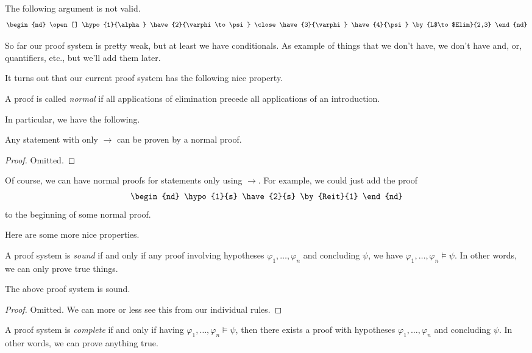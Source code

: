 \documentclass[../notes.tex]{subfiles}
\begin{document}
\begin{nex}
	The following argument is not valid.
	\begin{align*}
		\begin{nd}
			\open[]
				\hypo{1}{\alpha}
				\have{2}{\varphi\to\psi}
			\close
			\have{3}{\varphi}
			\have{4}{\psi} \by{L$\to$Elim}{2,3}
		\end{nd}
	\end{align*}
\end{nex}
So far our proof system is pretty weak, but at least we have conditionals. As example of things that we don't have, we don't have and, or, quantifiers, etc., but we'll add them later.

It turns out that our current proof system has the following nice property.
\begin{definition}[Normal]
	A proof is called \textit{normal} if all applications of elimination precede all applications of an introduction.
\end{definition}
In particular, we have the following.
\begin{proposition}
	Any statement with only $\to$ can be proven by a normal proof.
\end{proposition}
\begin{proof}
	Omitted.
\end{proof}
\begin{remark}
	Of course, we can have normal proofs for statements only using $\to$. For example, we could just add the proof
	\begin{align*}
		\begin{nd}
			\hypo{1}{s}
			\have{2}{s} \by{Reit}{1}
		\end{nd}
	\end{align*}
	to the beginning of some normal proof.
\end{remark}
Here are some more nice properties.
\begin{definition}[Sound]
	A proof system is \textit{sound} if and only if any proof involving hypotheses $\varphi_1,\ldots,\varphi_n$ and concluding $\psi$, we have $\varphi_1,\ldots,\varphi_n\models\psi$. In other words, we can only prove true things.
\end{definition}
\begin{proposition}
	The above proof system is sound.
\end{proposition}
\begin{proof}
	Omitted. We can more or less see this from our individual rules.
\end{proof}
\begin{definition}[Complete]
	A proof system is \textit{complete} if and only if having $\varphi_1,\ldots,\varphi_n\models\psi$, then there exists a proof with hypotheses $\varphi_1,\ldots,\varphi_n$ and concluding $\psi$. In other words, we can prove anything true.
\end{definition}
\end{document}
